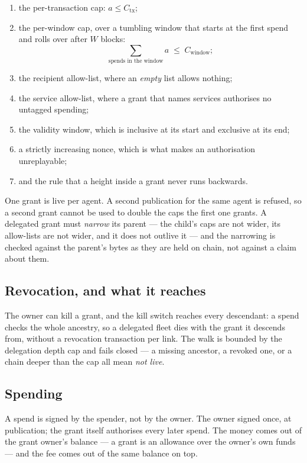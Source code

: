 \documentclass{article}
\begin{document}
\begin{enumerate}
\item the per-transaction cap: $a \leq C_{\mathrm{tx}}$;
\item the per-window cap, over a tumbling window that starts at the first spend
  and rolls over after $W$ blocks:
  \begin{equation}
  \sum_{\text{spends in the window}} a \;\leq\; C_{\mathrm{window}} ;
  \end{equation}
\item the recipient allow-list, where an \emph{empty} list allows nothing;
\item the service allow-list, where a grant that names services authorises no
  untagged spending;
\item the validity window, which is inclusive at its start and exclusive at its
  end;
\item a strictly increasing nonce, which is what makes an authorisation
  unreplayable;
\item and the rule that a height inside a grant never runs backwards.
\end{enumerate}

One grant is live per agent. A second publication for the same agent is
refused, so a second grant cannot be used to double the caps the first one
grants. A delegated grant must \emph{narrow} its parent --- the child's caps are
not wider, its allow-lists are not wider, and it does not outlive it --- and the
narrowing is checked against the parent's bytes as they are held on chain, not
against a claim about them.

\subsection{Revocation, and what it reaches}

The owner can kill a grant, and the kill switch reaches every descendant: a
spend checks the whole ancestry, so a delegated fleet dies with the grant it
descends from, without a revocation transaction per link. The walk is bounded
by the delegation depth cap and fails closed --- a missing ancestor, a revoked
one, or a chain deeper than the cap all mean \emph{not live}.

\subsection{Spending}

A spend is signed by the spender, not by the owner. The owner signed once, at
publication; the grant itself authorises every later spend. The money comes
out of the grant owner's balance --- a grant is an allowance over the owner's
own funds --- and the fee comes out of the same balance on top.
\end{document}
